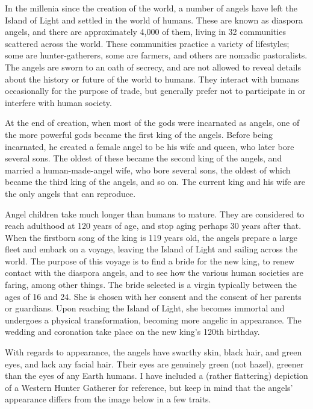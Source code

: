 \documentclass{article}
\begin{document}
In the millenia since the creation of the world, a number of angels have left the Island of Light and settled in the world of humans. These are known as diaspora angels, and there are approximately 4,000 of them, living in 32 communities scattered across the world. These communities practice a variety of lifestyles; some are hunter-gatherers, some are farmers, and others are nomadic pastoralists. The angels are sworn to an oath of secrecy, and are not allowed to reveal details about the history or future of the world to humans. They interact with humans occasionally for the purpose of trade, but generally prefer not to participate in or interfere with human society.

At the end of creation, when most of the gods were incarnated as angels, one of the more powerful gods became the first king of the angels. Before being incarnated, he created a female angel to be his wife and queen, who later bore several sons. The oldest of these became the second king of the angels, and married a human-made-angel wife, who bore several sons, the oldest of which became the third king of the angels, and so on. The current king and his wife are the only angels that can reproduce.

Angel children take much longer than humans to mature. They are considered to reach adulthood at 120 years of age, and stop aging perhaps 30 years after that. When the firstborn song of the king is 119 years old, the angels prepare a large fleet and embark on a voyage, leaving the Island of Light and sailing across the world. The purpose of this voyage is to find a bride for the new king, to renew contact with the diaspora angels, and to see how the various human societies are faring, among other things. The bride selected is a virgin typically between the ages of 16 and 24. She is chosen with her consent and the consent of her parents or guardians. Upon reaching the Island of Light, she becomes immortal and undergoes a physical transformation, becoming more angelic in appearance. The wedding and coronation take place on the new king's 120th birthday.

With regards to appearance, the angels have swarthy skin, black hair, and green eyes, and lack any facial hair. Their eyes are genuinely green (not hazel), greener than the eyes of any Earth humans. I have included a (rather flattering) depiction of a Western Hunter Gatherer for reference, but keep in mind that the angels' appearance differs from the image below in a few traits.
\end{document}
